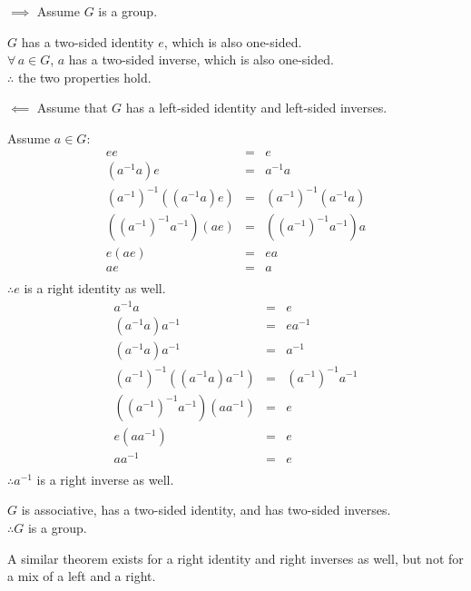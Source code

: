\documentclass[letterpaper,12pt,fleqn]{article}
\begin{document}
\begin{theproof}
  \listbreak
  \begin{description}
  \item $\implies$ Assume $G$ is a group.

    $G$ has a two-sided identity $e$, which is also one-sided. \\
    $\forall\,a\in G$, $a$ has a two-sided inverse, which is also one-sided. \\
    $\therefore$ the two properties hold.

  \item $\impliedby$ Assume that $G$ has a left-sided identity and
    left-sided inverses.
    
    Assume $a\in G$:
    \begin{eqnarray*}
      ee &=& e \\
      (a^{-1}a)e &=& a^{-1}a \\
      (a^{-1})^{-1}((a^{-1}a)e) &=& (a^{-1})^{-1}(a^{-1}a) \\
      ((a^{-1})^{-1}a^{-1})(ae) &=& ((a^{-1})^{-1}a^{-1})a \\
      e(ae) &=& ea \\
      ae &=& a \\
    \end{eqnarray*}
    $\therefore e$ is a right identity as well.
    \begin{eqnarray*}
      a^{-1}a &=& e \\
      (a^{-1}a)a^{-1} &=& ea^{-1} \\
      (a^{-1}a)a^{-1} &=& a^{-1} \\
      (a^{-1})^{-1}((a^{-1}a)a^{-1}) &=& (a^{-1})^{-1}a^{-1} \\
      ((a^{-1})^{-1}a^{-1})(aa^{-1}) &=& e \\
      e(aa^{-1}) &=& e \\
      aa^{-1} &=& e \\
    \end{eqnarray*}
    $\therefore a^{-1}$ is a right inverse as well.
    
    $G$ is associative, has a two-sided identity, and has two-sided inverses. \\
    $\therefore G$ is a group.
  \end{description}
\end{theproof}

A similar theorem exists for a right identity and right inverses as well, but
not for a mix of a left and a right.
\end{document}
